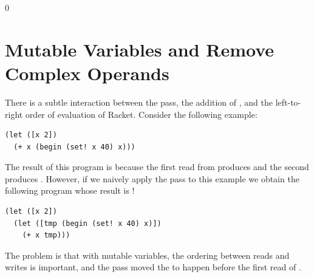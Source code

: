\documentclass[7x10]{TimesAPriori_MIT}%
\def\racketEd{0}
\providecommand{\BookEdition}{1}
\let\edition\BookEdition
\numberwithin{theorem}{chapter}
\numberwithin{definition}{chapter}
\numberwithin{equation}{chapter}
\begin{document}
{\if\edition\racketEd
\section{Mutable Variables and Remove Complex Operands}

There is a subtle interaction between the
 pass, the addition of ,
and the left-to-right order of evaluation of Racket. Consider the
following example:
\begin{lstlisting}
(let ([x 2])
  (+ x (begin (set! x 40) x)))
\end{lstlisting}
The result of this program is  because the first read from
 produces  and the second produces . However,
if we naively apply the  pass to this
example we obtain the following program whose result is !
\begin{lstlisting}
(let ([x 2])
  (let ([tmp (begin (set! x 40) x)])
    (+ x tmp)))
\end{lstlisting}
The problem is that with mutable variables, the ordering between
reads and writes is important, and the
 pass moved the  to happen
before the first read of .

}
\end{document}
